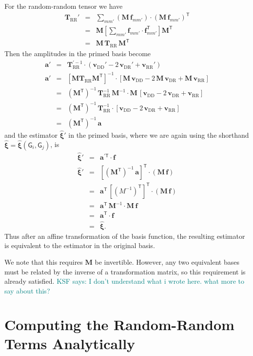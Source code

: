 \documentclass[modern]{aastex62}
\newcommand{\inv}{^{-1}}
\newcommand{\invp}{^{'-1}}
\newcommand{\T}{^{\mathsf{T}}}
\newcommand{\Tp}{^{'\mathsf{T}}}
\newcommand{\bld}[1]{\bm{#1}} %
\newcommand{\vv}[1]{\bld{v}_\mathrm{#1}}
\newcommand{\TT}[1]{\bld{T}_\mathrm{#1}}
\newcommand{\ff}{\bld{f}}
\newcommand{\GG}[1]{\mathsf{G}_{#1}}
\newcommand{\KSF}[1]{\textcolor{teal}{KSF says: #1}}
\begin{document}
For the random-random tensor we have
\begin{eqnarray}\displaystyle
\TT{RR}' &=& \sum_{m m'} (\bld{M}\,\ff_{m m'}) \cdot (\bld{M}\,\ff_{m m'})\T \\
&=& \bld{M}\left[ \sum_{m m'} \ff_{m m'} \cdot \ff_{m m'}\T \right] \bld{M}\T \\
&=& \bld{M}\,\TT{RR}\,\bld{M}\T
\end{eqnarray}
Then the amplitudes in the primed basis become
\begin{eqnarray}\displaystyle
\bld{a}' &=& \TT{RR}\invp \cdot (\vv{DD}' - 2\,\vv{DR}' + \vv{RR}') \\
\bld{a}' &=& [\bld{M} \TT{RR} \bld{M}\T]\inv \cdot [\bld{M}\,\vv{DD} - 2\,\bld{M}\,\vv{DR} + \bld{M}\,\vv{RR}] \\
&=& (\bld{M}\T)\inv \, \TT{RR}\inv \, \bld{M}\inv \cdot \bld{M}\,[\vv{DD} - 2\,\vv{DR} + \vv{RR}] \\
&=& (\bld{M}\T)\inv \, \TT{RR}\inv \cdot [\vv{DD} - 2\,\vv{DR} + \vv{RR}] \\
&=& (\bld{M}\T)\inv \, \bld{a}
\end{eqnarray}
and the estimator $\bld{\hat{\xi}}'$ in the primed basis, where we are again using the shorthand $\bld{\hat{\xi}} = \bld{\hat{\xi}}(\GG{i}, \GG{j})$, is 
\begin{eqnarray}\displaystyle
\bld{\hat{\xi}}' &=& \bld{a}\Tp \cdot \ff \\
\bld{\hat{\xi}}' &=& [(\bld{M}\T)\inv \, \bld{a}]\T \cdot (\bld{M}\,\ff) \\
&=& \bld{a}\T \, [(M\inv)\T]\T \cdot (\bld{M}\,\ff) \\
&=& \bld{a}\T \, \bld{M}\inv \cdot \bld{M}\,\ff \\
&=& \bld{a}\T \cdot \ff \\
&=& \bld{\hat{\xi}}.
\end{eqnarray}
Thus after an affine transformation of the basis function, the resulting estimator is equivalent to the estimator in the original basis.

We note that this requires $\bld{M}$ be invertible.
However, any two equivalent bases must be related by the inverse of a transformation matrix, so this requirement is already satisfied.
\KSF{I don't understand what i wrote here. what more to say about this?}


\section{Computing the Random-Random Terms Analytically}\label{sec:analytic}
\end{document}
